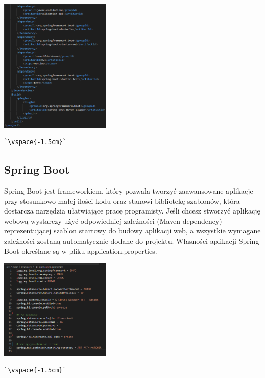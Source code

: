 \documentclass[10pt,a4paper]{report}
\begin{document}
\begin{adjustwidth}{2cm}{2cm}
\begin{center}
\includegraphics[width=200px]{img/pom1} 
\begin{lstlisting}[escapeinside=``,caption={Przykładowe użycie pliku pom.xml w projekcie}]
`\vspace{-1.5cm}`
\end{lstlisting}
\end{center}
\subsection{Spring Boot}
\begin{minipage}{1\linewidth}
Spring Boot jest frameworkiem, który pozwala tworzyć zaawansowane aplikacje przy stosunkowo małej ilości kodu oraz stanowi bibliotekę szablonów, która dostarcza narzędzia ułatwiające pracę programisty. Jeśli chcesz stworzyć aplikację webową wystarczy użyć odpowiedniej zależności (Maven dependency) reprezentującej szablon startowy do budowy aplikacji web, a wszystkie wymagane zależności zostaną automatycznie dodane do projektu.
Własności aplikacji Spring Boot określane są w pliku application.properties. 
\vspace{0.2cm}
\end{minipage}
\begin{center}
\includegraphics[width=200px]{img/properties} 
\begin{lstlisting}[escapeinside=``,caption={Przykładowe użycie pliku application.properties w projekcie}]
`\vspace{-1.5cm}`
\end{lstlisting}
\end{center}

\end{adjustwidth}
\end{document}
